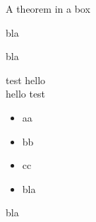 \documentclass{beamer}
\begin{document}
    \begin{frame}{A theorem in a box}
        \begin{definition}
            bla
        \end{definition}

        \begin{definition}
            bla
        \end{definition}

        test hello ~\\ \pause
        hello test \pause

        \begin{itemize}
           \item aa \pause
           \item bb \pause
           \item cc
           \item \begin{definition}
                    bla
                 \end{definition}
        \end{itemize}

        \begin{definition}
            bla
        \end{definition}
    \end{frame} 
\end{document}
